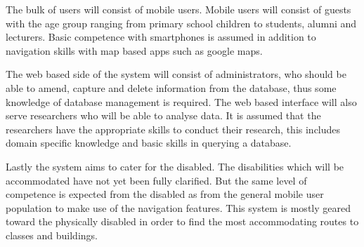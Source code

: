 The bulk of users will consist of mobile users. Mobile users will consist of guests with the age group ranging from primary school children to students, alumni and lecturers. Basic competence with smartphones is assumed in addition to navigation skills with map based apps such as google maps.
\par
\bigskip
\noindent
The web based side of the system will consist of administrators, who should be able to amend, capture and delete information from the database, thus some knowledge of database management is required. The web based interface will also serve researchers who will be able to analyse data. It is assumed that the researchers have the appropriate skills to conduct their research, this includes domain specific knowledge and basic skills in querying a database.
\par
\bigskip
\noindent
Lastly the system aims to cater for the disabled. The disabilities which will be accommodated have not yet been fully clarified. But the same level of competence is expected from the disabled as from the general mobile user population to make use of the navigation features. This system is mostly geared toward the physically disabled in order to find the most accommodating routes to classes and buildings.
